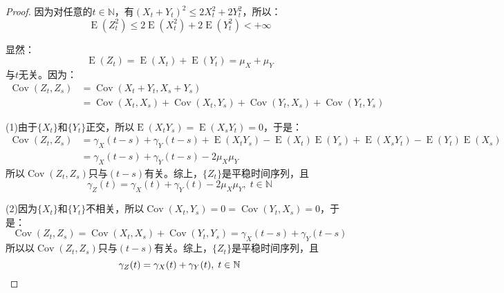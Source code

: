 \begin{proof}
	因为对任意的$t\in\mathbb{N}$，有$(X_t+Y_t)^2\leqslant2X_t^2+2Y_t^2$，所以：
	\begin{equation*}
		\operatorname{E}(Z_t^2)\leqslant2\operatorname{E}(X_t^2)+2\operatorname{E}(Y_t^2)<+\infty
	\end{equation*}\par
	显然：
	\begin{equation*}
		\operatorname{E}(Z_t)=\operatorname{E}(X_t)+\operatorname{E}(Y_t)=\mu_X+\mu_Y
	\end{equation*}
	与$t$无关。因为：
	\begin{align*}
		\operatorname{Cov}(Z_t,Z_s)
		&=\operatorname{Cov}(X_t+Y_t,X_s+Y_s) \\
		&=\operatorname{Cov}(X_t,X_s)+\operatorname{Cov}(X_t,Y_s)+\operatorname{Cov}(Y_t,X_s)+\operatorname{Cov}(Y_t,Y_s)
	\end{align*}\par
	(1)由于$\{X_t\}$和$\{Y_t\}$正交，所以$\operatorname{E}(X_tY_s)=\operatorname{E}(X_sY_t)=0$，于是：
	\begin{align*}
		\operatorname{Cov}(Z_t,Z_s)
		&=\gamma_X(t-s)+\gamma_Y(t-s)+\operatorname{E}(X_tY_s)-\operatorname{E}(X_t)\operatorname{E}(Y_s)+\operatorname{E}(X_sY_t)-\operatorname{E}(Y_t)\operatorname{E}(X_s) \\
		&=\gamma_X(t-s)+\gamma_Y(t-s)-2\mu_X\mu_Y
	\end{align*}
	所以$\operatorname{Cov}(Z_t,Z_s)$只与$(t-s)$有关。综上，$\{Z_t\}$是平稳时间序列，且
	\begin{equation*}
		\gamma_Z(t)=\gamma_X(t)+\gamma_Y(t)-2\mu_X\mu_Y,\;t\in\mathbb{N}
	\end{equation*}\par
	(2)因为$\{X_t\}$和$\{Y_t\}$不相关，所以$\operatorname{Cov}(X_t,Y_s)=0=\operatorname{Cov}(Y_t,X_s)=0$，于是：
	\begin{equation*}
		\operatorname{Cov}(Z_t,Z_s)=\operatorname{Cov}(X_t,X_s)+\operatorname{Cov}(Y_t,Y_s)=\gamma_X(t-s)+\gamma_Y(t-s)
	\end{equation*}
	所以以$\operatorname{Cov}(Z_t,Z_s)$只与$(t-s)$有关。综上，$\{Z_t\}$是平稳时间序列，且
	\begin{equation*}
		\gamma_Z(t)=\gamma_X(t)+\gamma_Y(t),\;t\in\mathbb{N}\qedhere
	\end{equation*}
\end{proof}
